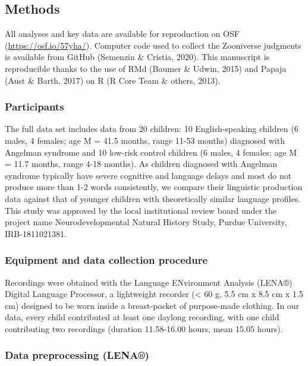 \documentclass[english,,man]{apa6}
\begin{document}
\hypertarget{methods}{%
\subsection{Methods}\label{methods}}

All analyses and key data are available for reproduction on OSF (\url{https://osf.io/57yha/}). Computer code used to collect the Zooniverse judgments is available from GitHub (Semenzin \& Cristia, 2020). This manuscript is reproducible thanks to the use of RMd (Baumer \& Udwin, 2015) and Papaja (Aust \& Barth, 2017) on R (R Core Team \& others, 2013).

\hypertarget{participants}{%
\subsubsection{Participants}\label{participants}}

The full data set includes data from 20 children: 10 English-speaking children (6 males, 4 females; age M = 41.5 months, range 11-53 months) diagnosed with Angelman syndrome and 10 low-risk control children (6 males, 4 females; age M = 11.7 months, range 4-18 months). As children diagnosed with Angelman syndrome typically have severe cognitive and language delays and most do not produce more than 1-2 words consistently, we compare their linguistic production data against that of younger children with theoretically similar language profiles. This study was approved by the local institutional review board under the project name Neurodevelopmental Natural History Study, Purdue University, IRB-1811021381.

\hypertarget{equipment-and-data-collection-procedure}{%
\subsubsection{Equipment and data collection procedure}\label{equipment-and-data-collection-procedure}}

Recordings were obtained with the Language ENvironment Analysis (LENA®) Digital Language Processor, a lightweight recorder (\textless{} 60 g, 5.5 cm x 8.5 cm x 1.5 cm) designed to be worn inside a breast-pocket of purpose-made clothing. In our data, every child contributed at least one daylong recording, with one child contributing two recordings (duration 11.58-16.00 hours, mean 15.05 hours).

\hypertarget{data-preprocessing-lena}{%
\subsubsection{Data preprocessing (LENA®)}\label{data-preprocessing-lena}}
\end{document}
